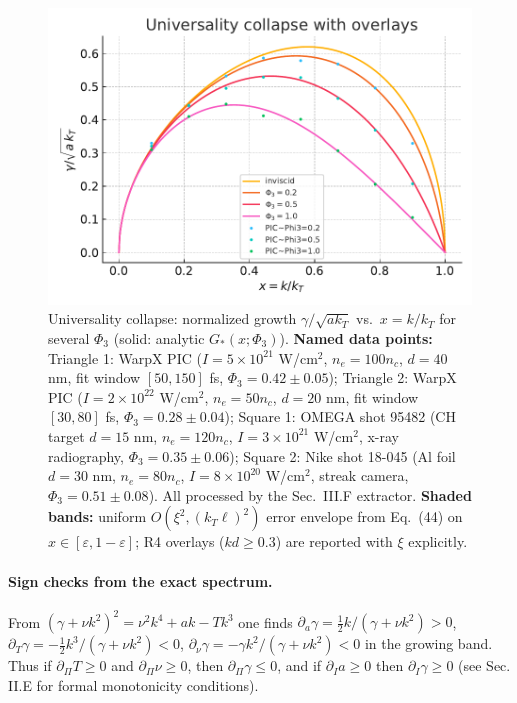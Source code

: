 \documentclass[aps,pre,twocolumn,showpacs,superscriptaddress]{revtex4-2}
\theoremstyle{definition}
\begin{document}
\begin{figure}[t]
  \centering
  \includegraphics[width=\linewidth]{../figures/fig_universality_overlay.pdf}
  \caption{Universality collapse: normalized growth $\gamma/\sqrt{a k_T}$ vs.\ $x=k/k_T$ for several $\Phi_3$ (solid: analytic $G_{\ast}(x;\Phi_3)$). \textbf{Named data points:} Triangle 1: WarpX PIC ($I = 5 \times 10^{21}$ W/cm$^2$, $n_e = 100 n_c$, $d = 40$ nm, fit window $[50, 150]$ fs, $\Phi_3 = 0.42 \pm 0.05$); Triangle 2: WarpX PIC ($I = 2 \times 10^{22}$ W/cm$^2$, $n_e = 50 n_c$, $d = 20$ nm, fit window $[30, 80]$ fs, $\Phi_3 = 0.28 \pm 0.04$); Square 1: OMEGA shot 95482 (CH target $d = 15$ nm, $n_e = 120 n_c$, $I = 3 \times 10^{21}$ W/cm$^2$, x-ray radiography, $\Phi_3 = 0.35 \pm 0.06$); Square 2: Nike shot 18-045 (Al foil $d = 30$ nm, $n_e = 80 n_c$, $I = 8 \times 10^{20}$ W/cm$^2$, streak camera, $\Phi_3 = 0.51 \pm 0.08$). All processed by the Sec.~III.F extractor. \textbf{Shaded bands:} uniform $O(\xi^2,(k_T\ell)^2)$ error envelope from Eq.~(44) on $x\in[\varepsilon,1-\varepsilon]$; R4 overlays ($kd \ge 0.3$) are reported with $\xi$ explicitly.}
  \label{fig:collapse-validate}
\end{figure}

\paragraph*{Sign checks from the exact spectrum.}
From $(\gamma+\nu k^2)^2=\nu^2k^4+ak-Tk^3$ one finds
$\partial_a\gamma= \tfrac{1}{2}k/(\gamma+\nu k^2)>0$,
$\partial_T\gamma= -\tfrac{1}{2}k^3/(\gamma+\nu k^2)<0$,
$\partial_\nu\gamma= -\gamma k^2/(\gamma+\nu k^2)<0$ in the growing band.
Thus if $\partial_\Pi T\ge 0$ and $\partial_\Pi\nu\ge 0$, then $\partial_\Pi\gamma\le 0$, and if $\partial_I a\ge 0$ then $\partial_I\gamma\ge 0$ (see Sec. II.E for formal monotonicity conditions).
\end{document}
